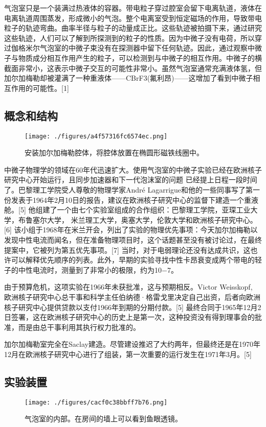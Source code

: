 气泡室只是一个装满过热液体的容器。带电粒子穿过腔室会留下电离轨道，液体在电离轨道周围蒸发，形成微小的气泡。整个电离室受到恒定磁场的作用，导致带电粒子的轨迹弯曲。曲率半径与粒子的动量成正比。这些轨迹被拍摄下来，通过研究这些轨迹，人们可以了解到所探测到的粒子的性质。因为中微子没有电荷，所以穿过伽格米尔气泡室的中微子束没有在探测器中留下任何轨迹。因此，通过观察中微子与物质成分相互作用产生的粒子，可以检测到与中微子的相互作用。中微子的横截面非常小，这表示中微子交互的可能性非常小。虽然气泡室通常充满液体氢，但加尔加梅勒却被灌满了一种重液体——CBrF3(氟利昂)——这增加了看到中微子相互作用的可能性。[1]

\subsection{概念和结构}
\begin{figure}[ht]
\centering
\texttt{[image: ./figures/a4f57316fc6574ec.png]}
\caption{安装加尔加梅勒腔体，将腔体放置在椭圆形磁铁线圈中。} \label{fig_JRJML_2}
\end{figure}
中微子物理学的领域在60年代迅速扩大。使用气泡室的中微子实验已经在欧洲核子研究中心开始运行，且同步加速器和下一代泡沫室的问题 已经提上日程一段时间了。巴黎理工学院受人尊敬的物理学家André Lagarrigue和他的一些同事写了第一份发表于1964年2月10日的报告，建议在欧洲核子研究中心的监督下建造一个重液舱。[5] 他组建了一个由七个实验室组成的合作组织：巴黎理工学院，亚琛工业大学，布鲁塞尔大学， 米兰理工大学，奥塞大学，伦敦大学和欧洲核子研究中心。[6] 该小组于1968年在米兰开会，列出了实验的物理优先事项：今天加尔加梅勒以发现中性电流而闻名，但在准备物理项目时，这个话题甚至没有被讨论过，在最终提案中，它被列为第五优先事项。[7] 当时，对于电弱理论还没有达成共识，这也许可以解释优先顺序的列表。此外，早期的实验寻找中性卡昂衰变成两个带电的轻子的中性电流时，测量到了非常小的极限，约为10−7。

由于预算危机，这项实验在1966年未获批准，这与预期相反。Victor Weisskopf, 欧洲核子研究中心总干事和科学主任伯纳德·格雷戈里决定自己出资，后者向欧洲核子研究中心提供贷款以支付1966年到期的分期付款。[5] 最终合同于1965年12月2日签署，这在欧洲核子研究中心的历史上是第一次，这种投资没有得到理事会的批准，而是由总干事利用其执行权力批准的。

加尔加梅勒室完全在Saclay建造。尽管建设推迟了大约两年，但最终还是在1970年12月在欧洲核子研究中心进行了组装，第一次重要的运行发生在1971年3月。[5]

\subsection{实验装置}
\begin{figure}[ht]
\centering
\texttt{[image: ./figures/cacf0c38bbff7b76.png]}
\caption{气泡室的内部。在房间的墙上可以看到鱼眼透镜。} \label{fig_JRJML_3}
\end{figure}
